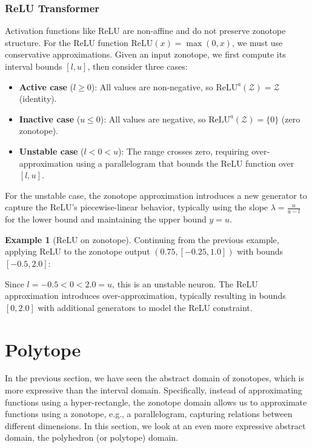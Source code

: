 \documentclass[oneside,11pt,dvipsnames]{book}
\numberwithin{equation}{section}
\theoremstyle{definition}
\newtheorem{example}{Example}[section]
\theoremstyle{remark}
\begin{document}
\subsubsection{ReLU Transformer}

Activation functions like ReLU are non-affine and do not preserve zonotope structure. For the ReLU function \(\text{ReLU}(x) = \max(0, x)\), we must use conservative approximations. Given an input zonotope, we first compute its interval bounds \([l, u]\), then consider three cases:

\begin{itemize}
    \item \textbf{Active case} (\(l \geq 0\)): All values are non-negative, so \(\text{ReLU}^a(\mathcal{Z}) = \mathcal{Z}\) (identity).
    \item \textbf{Inactive case} (\(u \leq 0\)): All values are negative, so \(\text{ReLU}^a(\mathcal{Z}) = \{0\}\) (zero zonotope).
    \item \textbf{Unstable case} (\(l < 0 < u\)): The range crosses zero, requiring over-approximation using a parallelogram that bounds the ReLU function over \([l, u]\).
\end{itemize}

For the unstable case, the zonotope approximation introduces a new generator to capture the ReLU's piecewise-linear behavior, typically using the slope \(\lambda = \frac{u}{u-l}\) for the lower bound and maintaining the upper bound \(y = u\).

\begin{example}[ReLU on zonotope]
Continuing from the previous example, applying ReLU to the zonotope output \((0.75, [-0.25, 1.0])\) with bounds \([-0.5, 2.0]\):

Since \(l = -0.5 < 0 < 2.0 = u\), this is an unstable neuron. The ReLU approximation introduces over-approximation, typically resulting in bounds \([0, 2.0]\) with additional generators to model the ReLU constraint.
\end{example}



\section{Polytope}

In the previous section, we have seen the abstract domain of zonotopes, which is more expressive than the interval domain. Specifically, instead of approximating functions using a hyper-rectangle, the zonotope domain allows us to approximate functions using a zonotope, e.g., a parallelogram, capturing relations between different dimensions. In this section, we look at an even more expressive abstract domain, the polyhedron (or polytope) domain. 
\end{document}
